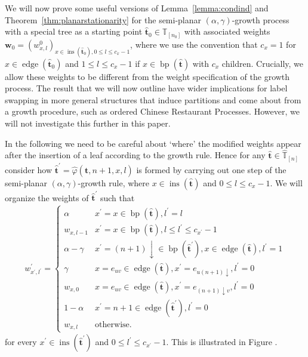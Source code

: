 \documentclass[a4paper, final]{amsart}
\theoremstyle{plain}
\theoremstyle{definition}
\newcommand{\that}[1][t]{\hat{\boldsymbol{#1}}} %
\newcommand{\Thatspace}[1][\T]{\widehat{\boldsymbol{#1}}} %
\newcommand{\T}{\mathbb{T}}
\DeclareMathOperator{\edge}{edge}
\DeclareMathOperator{\insertable}{ins}
\DeclareMathOperator{\branchpoints}{bp}
\begin{document}
%
We will now prove some useful versions of Lemma~\ref{lemma:condind} and Theorem~\ref{thm:planarstationarity} for the semi-planar $(\alpha, \gamma)$-growth process with a special tree as a starting point $\that_0 \in \T_{[n_0]}$ with associated weights $\mathbf{w}_0 = {\left( w_{x, l}^0 \right)}_{x \in \insertable (\that_0), 0 \leq l \leq c_x - 1}$, where we use the convention that $c_x = 1$ for $x \in \edge(\that_0)$ and $1 \leq l \leq c_x - 1$ if $x \in \branchpoints (\that)$ with $c_x$ children.
Crucially, we allow these weights to be different from the weight specification of the growth process.
The result that we will now outline have wider implications for label swapping in more general structures that induce partitions and come about from a growth procedure, such as ordered Chinese Restaurant Processes.
However, we will not investigate this further in this paper.

In the following we need to be careful about `where' the modified weights appear after the insertion of a leaf according to the growth rule.
Hence for any $\that \in \Thatspace_{[n]}$ consider how $\that^\prime = \hat{\varphi}\left( \that, n+1, x, l \right)$ is formed by carrying out one step of the semi-planar $(\alpha, \gamma)$-growth rule, where $x \in \insertable (\that)$ and $0 \leq l \leq c_x - 1$.
We will organize the weights of $\that^\prime$ such that
%
\begin{align}
  \label{eq:organized_weight_schemes}
  w_{x^\prime,l^\prime}^\prime
  =
  \begin{cases}
    \alpha & x^\prime = x \in \branchpoints (\that), l^\prime = l \\
    w_{x, l - 1} & x^\prime = x \in \branchpoints (\that), l \leq l^\prime \leq c_{x^\prime} - 1 \\
    \alpha - \gamma & x^\prime = (n+1)\downarrow \in \branchpoints (\that^\prime), x \in \edge (\that), l^\prime = 1 \\
    \gamma & x = e_{uv} \in \edge (\that), x^\prime = e_{u \left( n+1 \right) \downarrow}, l^\prime = 0 \\
    w_{x, 0} & x = e_{uv} \in \edge (\that), x^\prime = e_{\left( n+1 \right) \downarrow v}, l^\prime = 0 \\
    1-\alpha & x^\prime = n+1 \in \edge (\that^\prime), l^\prime = 0 \\
    w_{x, l} & \text{otherwise.}
  \end{cases}
\end{align}
%
for every $x^\prime \in \insertable (\that^\prime)$ and $0 \leq l^\prime \leq c_{x^\prime} - 1$.
This is illustrated in Figure .
\end{document}
